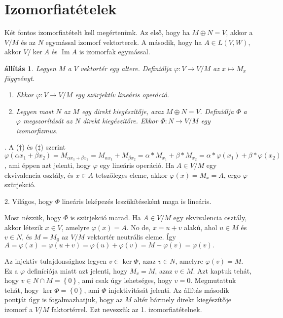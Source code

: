 \documentclass[a4paper, showtrims]{memoir}
\makeatletter
\renewenvironment{proof}[1][\proofname]
    {\par\pushQED{\qed}%
    \normalfont \topsep6\p@\@plus6\p@\relax
    \trivlist
    \item[\hskip\labelsep
        \itshape
    #1\@addpunct{:}]\ignorespaces}
    {\popQED\endtrivlist\@endpefalse}
\theoremstyle{plain}
\newtheorem{proposition}{állítás}[chapter]
\theoremstyle{remark}
\theoremstyle{definition}
\DeclareMathOperator{\im}{Im}
\makeatother
\begin{document}
\section{Izomorfiatételek}
Két fontos izomorfiatételt kell megértenünk.
Az első, hogy ha $M\oplus N=V$, akkor a $V/M$ és az $N$ egymással izomorf vektorterek.
A második, hogy ha $A\in L\left( V,W \right)$, akkor $V/\ker A$ és $\im A$ is izomorfak egymással.
\begin{proposition}
	Legyen $M$ a $V$ vektortér egy altere.
	Definiálja $\varphi:V\to V/M$ az $x\mapsto M_x$ függvényt.
	\begin{enumerate}
		\item Ekkor $\varphi:V\to V/M$ egy szürjektív lineáris operáció.
		\item Legyen most $N$ az $M$ egy direkt kiegészítője,
		      azaz $M\oplus N=V$.
		      Definiálja $\Phi$ a $\varphi$ megszorítását az $N$ direkt kiegészítőre.
		      Ekkor $\Phi:N\to V/M$ egy izomorfizmus.\qedhere
	\end{enumerate}
\end{proposition}
\begin{proof}
	1. A ($\dag$) és ($\ddag$) szerint
	$
		\varphi\left( \alpha x_1+\beta x_2 \right)
		=
		M_{\alpha x_1+\beta x_2}
		=
		M_{\alpha x_1}+M_{\beta x_2}
		=
		\alpha\ast M_{x_1}+\beta\ast M_{x_2}
		=
		\alpha\ast\varphi\left( x_1 \right)+\beta\ast\varphi\left( x_2 \right)
	$,
	ami éppen azt jelenti, hogy $\varphi$ egy lineáris operáció.
	Ha $A\in V/M$ egy ekvivalencia osztály, és $x\in A$ tetszőleges eleme,
	akkor $\varphi\left( x \right)=M_x=A$, ergo $\varphi$ szürjekció.

	2. Világos, hogy $\Phi$ lineáris leképezés leszűkítéseként maga is lineáris.

	Most nézzük, hogy $\Phi$ is szürjekció marad.
	Ha $A\in V/M$ egy ekvivalencia osztály,
	akkor létezik $x\in V$, amelyre $\varphi\left( x \right)=A$.
	No de, $x=u+v$ alakú, ahol $u\in M$ és $v\in N$, és $M=M_0$ az $V/M$ vektortér neutrális eleme.
	Így
	$
		A=\varphi\left( x \right)=\varphi\left( u+v \right)=\varphi\left( u \right)+\varphi\left( v \right)
		=M+\varphi\left( v \right)=\varphi\left( v \right).
	$

	Az injektiv tulajdonsághoz legyen $v\in \ker\Phi$,
	azaz $v\in N$, amelyre $\varphi\left( v \right)=M$.
	Ez a $\varphi$ definíciója miatt azt jelenti, hogy $M_v=M$, azaz $v\in M$.
	Azt kaptuk tehát, hogy $v\in N\cap M=\left\{ 0 \right\}$,
	ami csak úgy lehetséges,
	hogy $v=0$.
	Megmutattuk tehát, hogy $\ker\Phi=\left\{ 0 \right\}$,
	ami $\Phi$ injektivitását jelenti.
\end{proof}
Az állítás második pontját úgy is fogalmazhatjuk,
hogy az $M$ altér bármely direkt kiegészítője izomorf a $V/M$ faktortérrel.
Ezt nevezzük az 1. izomorfiatételnek.
\end{document}
